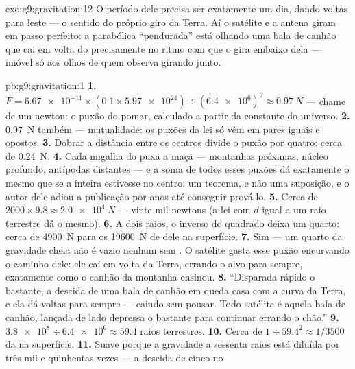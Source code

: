 \begin{solution}{exo:g9:gravitation:12}
O período dele precisa ser exatamente um dia, dando voltas para
leste --- o sentido do próprio giro da Terra. Aí o satélite e a
antena giram em passo perfeito: a parabólica ``pendurada'' está
olhando uma bala de canhão que cai em volta do  precisamente
no ritmo com que o  gira embaixo dela --- imóvel só aos olhos
de quem observa girando junto.
\end{solution}

\begin{solution}{pb:g9:gravitation:1}
\textbf{1.} $F = \num{6.67e-11} \times (0.1 \times
\num{5.97e24}) \div (\num{6.4e6})^2 \approx \qty{0.97}{N}$ ---
chame de um newton: o puxão do pomar, calculado a partir da constante
do universo.
\textbf{2.} \qty{0.97}{N} também --- mutualidade: os puxões da lei só
vêm em pares iguais e opostos.
\textbf{3.} Dobrar a distância entre os centros divide o puxão por
quatro: cerca de \qty{0.24}{N}.
\textbf{4.} Cada migalha do  puxa a maçã --- montanhas
próximas, núcleo profundo, antípodas distantes --- e a soma de todos
esses puxões dá exatamente o mesmo que se a  inteira estivesse
no centro: um teorema, e não uma suposição, e o autor dele adiou a
publicação por anos até conseguir prová-lo.
\textbf{5.} Cerca de $2000 \times 9.8 \approx \qty{2.0e4}{N}$ ---
vinte mil newtons (a lei com $d$ igual a um raio terrestre dá o
mesmo).
\textbf{6.} A dois raios, o inverso do quadrado deixa um quarto:
cerca de \qty{4900}{N} para os \qty{19600}{N} de  dele na
superfície.
\textbf{7.} Sim --- um quarto da gravidade cheia não é vazio nenhum
sem . O satélite gasta esse puxão encurvando o caminho dele: ele
cai em volta da Terra, errando o alvo para sempre, exatamente como o
canhão da montanha ensinou.
\textbf{8.} ``Disparada rápido o bastante, a descida de uma bala de
canhão em queda casa com a curva da Terra, e ela dá voltas para
sempre --- caindo sem pousar. Todo satélite é aquela bala de canhão,
lançada de lado depressa o bastante para continuar errando o chão.''
\textbf{9.} $\num{3.8e8} \div \num{6.4e6} \approx 59.4$ raios
terrestres.
\textbf{10.} Cerca de $1 \div 59.4^2 \approx 1/3500$ da  na
superfície.
\textbf{11.} Suave porque a gravidade a sessenta raios está diluída
por três mil e quinhentas vezes --- a descida de cinco  no

\end{solution}
